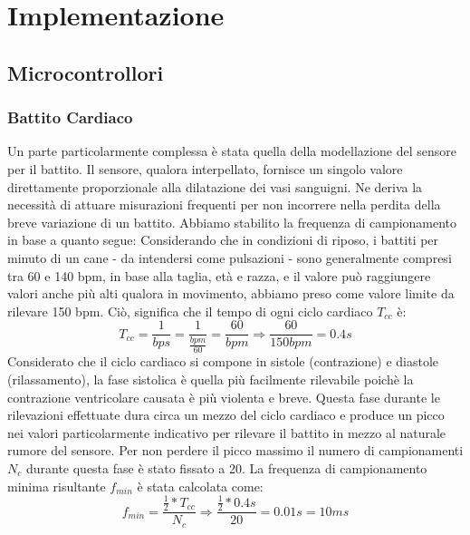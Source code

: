 \chapter{Implementazione}
\section{Microcontrollori}
\subsection{Battito Cardiaco}
Un parte particolarmente complessa è stata quella della modellazione del sensore per il battito. Il sensore, qualora interpellato, fornisce un singolo valore direttamente proporzionale alla dilatazione dei vasi sanguigni. Ne deriva la necessità di attuare misurazioni frequenti per non incorrere nella perdita della breve variazione di un battito. Abbiamo stabilito la frequenza di campionamento in base a quanto segue:
Considerando che in condizioni di riposo, i battiti per minuto di un cane - da intendersi come pulsazioni - sono generalmente compresi tra 60 e 140 bpm, in base alla taglia, età e razza, e il valore può raggiungere valori anche più alti qualora in movimento, abbiamo preso come valore limite da rilevare 150 bpm. Ciò, significa che il tempo di ogni ciclo cardiaco $T_{cc}$ è:
\begin{equation}
T_{cc} = \frac{1}{bps} = \frac{1}{\frac{bpm}{60}}= \frac{60}{bpm} \Rightarrow \frac{60}{150 bpm} = 0.4s
\end{equation}
Considerato che il ciclo cardiaco si compone in sistole (contrazione) e diastole (rilassamento), la fase sistolica è quella più facilmente rilevabile poichè la contrazione ventricolare causata è più violenta e breve. Questa fase durante le rilevazioni effettuate dura circa un mezzo del ciclo cardiaco e produce un picco nei valori particolarmente indicativo per rilevare il battito in mezzo al naturale rumore del sensore. Per non perdere il picco massimo il numero di campionamenti $N_{c}$ durante questa fase è stato fissato a 20. La frequenza di campionamento minima risultante $f_{min}$ è stata calcolata come: 
\begin{equation}
f_{min} = \frac{ \frac{1}{2} *  T_{cc} }{N_{c}} \Rightarrow  \frac{ \frac{1}{2} *  0.4s }{20} = 0.01s = 10 ms 
\end{equation}

